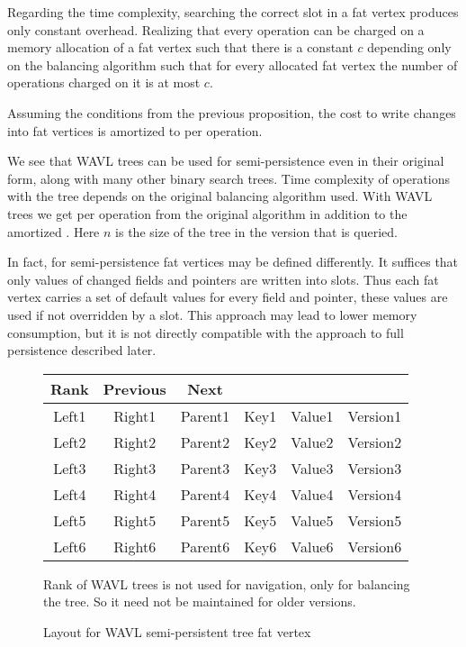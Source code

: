 Regarding the time complexity, searching the correct slot in a fat vertex produces only constant overhead. Realizing that every operation can be charged on a memory allocation of a fat vertex such that there is a constant $c$ depending only on the balancing algorithm such that for every allocated fat vertex the number of operations charged on it is at most $c$.

\begin{obs}
Assuming the conditions from the previous proposition, the cost to write changes into fat vertices is amortized to  per operation.
\end{obs}

We see that WAVL trees can be used for semi-persistence even in their original form, along with many other binary search trees. Time complexity of operations with the tree depends on the original balancing algorithm used. With WAVL trees we get  per operation from the original algorithm in addition to the amortized . Here $n$ is the size of the tree in the version that is queried.

In fact, for semi-persistence fat vertices may be defined differently. It suffices that only values of changed fields and pointers are written into slots. 
Thus each fat vertex carries a set of default values for every field and pointer, these values are used if not overridden by a slot. 
This approach may lead to lower memory consumption, but it is not directly compatible with the approach to full persistence described later.

\begin{figure}
\begin{center}
	\ttfamily
	\begin{tabular}{cccccc}
		Rank  & Previous &  Next   &      & &          \\ \hline
		Left1 &  Right1  & Parent1 & Key1 & Value1 &  Version1 \\ \hline
		Left2 &  Right2  & Parent2 & Key2 & Value2 & Version2 \\ \hline
		Left3 &  Right3  & Parent3 & Key3 & Value3 & Version3 \\ \hline
		Left4 &  Right4  & Parent4 & Key4 & Value4 & Version4 \\ \hline
		Left5 &  Right5  & Parent5 & Key5 & Value5 & Version5 \\ \hline
		Left6 &  Right6  & Parent6 & Key6 & Value6 & Version6 \\ \hline
	\end{tabular}
\end{center}
Rank of WAVL trees is not used for navigation, only for balancing the tree. So it need not be maintained for older versions.
\caption{Layout for WAVL semi-persistent tree fat vertex}
\end{figure}

